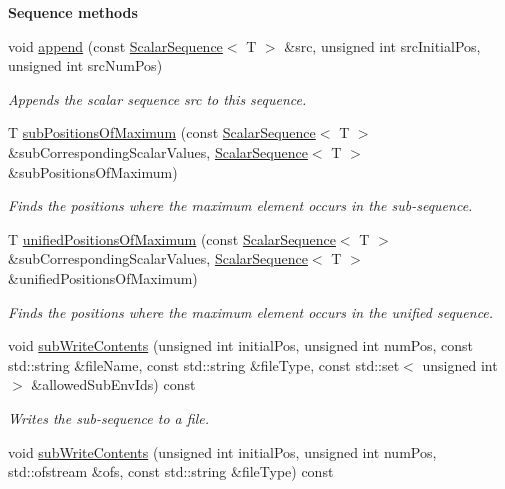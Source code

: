 \begin{Indent}{\bf Sequence methods}
\begin{DoxyCompactItemize}
void \hyperlink{class_q_u_e_s_o_1_1_scalar_sequence_a75cdd556cc417e35a6b9f7aff86896ae}{append} (const \hyperlink{class_q_u_e_s_o_1_1_scalar_sequence}{Scalar\-Sequence}$<$ T $>$ \&src, unsigned int src\-Initial\-Pos, unsigned int src\-Num\-Pos)
\begin{DoxyCompactList}\small\item\em Appends the scalar sequence {\ttfamily src} to {\ttfamily this} sequence. \end{DoxyCompactList}\item 
T \hyperlink{class_q_u_e_s_o_1_1_scalar_sequence_aea60fb016374a3f35445ce444e599518}{sub\-Positions\-Of\-Maximum} (const \hyperlink{class_q_u_e_s_o_1_1_scalar_sequence}{Scalar\-Sequence}$<$ T $>$ \&sub\-Corresponding\-Scalar\-Values, \hyperlink{class_q_u_e_s_o_1_1_scalar_sequence}{Scalar\-Sequence}$<$ T $>$ \&sub\-Positions\-Of\-Maximum)
\begin{DoxyCompactList}\small\item\em Finds the positions where the maximum element occurs in the sub-\/sequence. \end{DoxyCompactList}\item 
T \hyperlink{class_q_u_e_s_o_1_1_scalar_sequence_afef5af747fb011877b656b0e417b850b}{unified\-Positions\-Of\-Maximum} (const \hyperlink{class_q_u_e_s_o_1_1_scalar_sequence}{Scalar\-Sequence}$<$ T $>$ \&sub\-Corresponding\-Scalar\-Values, \hyperlink{class_q_u_e_s_o_1_1_scalar_sequence}{Scalar\-Sequence}$<$ T $>$ \&unified\-Positions\-Of\-Maximum)
\begin{DoxyCompactList}\small\item\em Finds the positions where the maximum element occurs in the unified sequence. \end{DoxyCompactList}\item 
void \hyperlink{class_q_u_e_s_o_1_1_scalar_sequence_aa162c8bbca4e0dedca894828c57e1fa7}{sub\-Write\-Contents} (unsigned int initial\-Pos, unsigned int num\-Pos, const std\-::string \&file\-Name, const std\-::string \&file\-Type, const std\-::set$<$ unsigned int $>$ \&allowed\-Sub\-Env\-Ids) const 
\begin{DoxyCompactList}\small\item\em Writes the sub-\/sequence to a file. \end{DoxyCompactList}\item 
void \hyperlink{class_q_u_e_s_o_1_1_scalar_sequence_a955a765fcd93e63165f6497bacd9dbb4}{sub\-Write\-Contents} (unsigned int initial\-Pos, unsigned int num\-Pos, std\-::ofstream \&ofs, const std\-::string \&file\-Type) const 

\end{DoxyCompactItemize}
\end{Indent}
